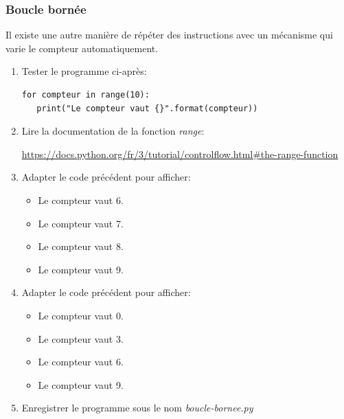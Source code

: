 \documentclass[a4paper,11pt]{article}
\begin{document}
\begin{Form}
\subsubsection{Boucle bornée}
Il existe une autre manière de répéter des instructions avec un mécanisme qui varie le compteur automatiquement.
\begin{activite}
\begin{enumerate}
\item Tester le programme ci-après:
\begin{lstlisting}
for compteur in range(10):
   print("Le compteur vaut {}".format(compteur))
\end{lstlisting}
\item Lire la documentation de la fonction \emph{range}:
\begin{center}
\url{https://docs.python.org/fr/3/tutorial/controlflow.html#the-range-function}
\end{center}
\item Adapter le code précédent pour afficher:
\begin{itemize}
\item Le compteur vaut 6.
\item Le compteur vaut 7.
\item Le compteur vaut 8.
\item Le compteur vaut 9.
\end{itemize}
\item Adapter le code précédent pour afficher:
\begin{itemize}
\item Le compteur vaut 0.
\item Le compteur vaut 3.
\item Le compteur vaut 6.
\item Le compteur vaut 9.
\end{itemize}
\item Enregistrer le programme sous le nom \emph{boucle-bornee.py}
\end{enumerate}
\end{activite}
\end{Form}
\end{document}
